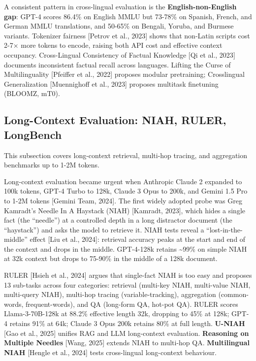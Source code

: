 A consistent pattern in cross-lingual evaluation is the \textbf{English-non-English gap}: GPT-4 scores 86.4\% on English MMLU but 73-78\% on Spanish, French, and German MMLU translations, and 50-65\% on Bengali, Yoruba, and Burmese variants. Tokenizer fairness {[}Petrov et al., 2023{]} shows that non-Latin scripts cost 2-7× more tokens to encode, raising both API cost and effective context occupancy. Cross-Lingual Consistency of Factual Knowledge {[}Qi et al., 2023{]} documents inconsistent factual recall across languages. Lifting the Curse of Multilinguality {[}Pfeiffer et al., 2022{]} proposes modular pretraining; Crosslingual Generalization {[}Muennighoff et al., 2023{]} proposes multitask finetuning (BLOOMZ, mT0).

\subsection{Long-Context Evaluation: NIAH, RULER, LongBench}\label{long-context-evaluation-niah-ruler-longbench}

This subsection covers long-context retrieval, multi-hop tracing, and aggregation benchmarks up to 1-2M tokens.

Long-context evaluation became urgent when Anthropic Claude 2 expanded to 100k tokens, GPT-4 Turbo to 128k, Claude 3 Opus to 200k, and Gemini 1.5 Pro to 1-2M tokens {[}Gemini Team, 2024{]}. The first widely adopted probe was Greg Kamradt's Needle In A Haystack (NIAH) {[}Kamradt, 2023{]}, which hides a single fact (the ``needle'') at a controlled depth in a long distractor document (the ``haystack'') and asks the model to retrieve it. NIAH tests reveal a ``lost-in-the-middle'' effect {[}Liu et al., 2024{]}: retrieval accuracy peaks at the start and end of the context and drops in the middle. GPT-4-128k retains \textasciitilde99\% on simple NIAH at 32k context but drops to 75-90\% in the middle of a 128k document.

RULER {[}Hsieh et al., 2024{]} argues that single-fact NIAH is too easy and proposes 13 sub-tasks across four categories: retrieval (multi-key NIAH, multi-value NIAH, multi-query NIAH), multi-hop tracing (variable-tracking), aggregation (common-words, frequent-words), and QA (long-form QA, hot-pot QA). RULER scores Llama-3-70B-128k at 88.2\% effective length 32k, dropping to 45\% at 128k; GPT-4 retains 91\% at 64k; Claude 3 Opus 200k retains 80\% at full length. \textbf{U-NIAH} {[}Gao et al., 2025{]} unifies RAG and LLM long-context evaluation. \textbf{Reasoning on Multiple Needles} {[}Wang, 2025{]} extends NIAH to multi-hop QA. \textbf{Multilingual NIAH} {[}Hengle et al., 2024{]} tests cross-lingual long-context behaviour.


